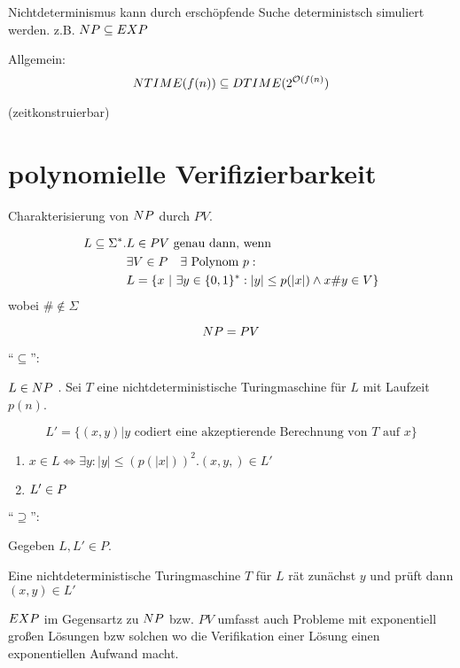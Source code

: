 Nichtdeterminismus kann durch erschöpfende Suche deterministsch simuliert werden.
z.B. $NP \subseteq EXP$


Allgemein:
$$NTIME(f(n)) \subseteq DTIME(2^{\mathcal{O}(f(n)})$$

(zeitkonstruierbar)


\section{polynomielle Verifizierbarkeit}


\begin{definition}

    Charakterisierung von $NP$ durch  $PV$.

    \begin{align*}
        L \subseteq \Sigma^{\ast} . & L \in PV \text{ genau dann, wenn }\\
                                  & \exists V \in P ~~~\exists \text{ Polynom } p : \\
                                  & L = \{ x ~|~ \exists y \in \{0,1\}^\ast : |y| \leq p(|x|) \land
                                    x\#y \in V \}
    \end{align*}
    wobei $\# \notin \Sigma$

\end{definition}


\begin{satz}
    $$ NP = PV $$
\end{satz}
\begin{beweis}
    ``$\subseteq$'':

    $L \in NP$ . Sei $T$ eine nichtdeterministische Turingmaschine für $L$ mit Laufzeit $p(n)$.

    $$ L' = \{(x,y) | y \text{ codiert eine akzeptierende Berechnung von } T \text{ auf } x \} $$

    \begin{enumerate}
        \item $x \in L \Leftrightarrow  \exists y: |y| \leq (p(|x|))^2 . (x,y,) \in L'$
        \item $L' \in P$
    \end{enumerate}


    ``$\supseteq$'':

     Gegeben $L, L' \in P$. 

     Eine nichtdeterministische Turingmaschine $T$ für $L$ rät zunächst $y$ und prüft dann $(x,y) \in L'$
\end{beweis}
  

$EXP$ im Gegensartz zu $NP$ bzw. $PV$ umfasst auch Probleme mit exponentiell großen Lösungen bzw solchen wo die Verifikation einer Lösung einen exponentiellen Aufwand macht.






